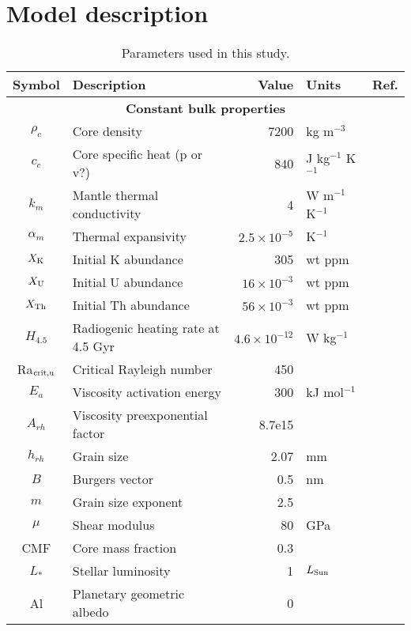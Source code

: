 \section{Model description}

\begin{table}
\centering
\caption{Parameters used in this study. \label{tab:params}}
\footnotesize
\begin{tabular}{@{} c l r l p{4cm} @{}}
\toprule
Symbol & Description & Value & Units & Ref. \\
\midrule
\multicolumn{5}{c}{\textbf{Constant bulk properties}} \\
$\rho_c$ & Core density & 7200 & kg m$^{-3}$ &  \citet{Thiriet2019}  \\
$c_c$ & Core specific heat (p or v?) & 840 & J kg$^{-1}$ K$^{-1}$  & \citet{Thiriet2019}  \\
$k_m$ & Mantle thermal conductivity & 4 & W m$^{-1}$ K$^{-1}$  & \citet{Thiriet2019}  \\
$\alpha_m$ & Thermal expansivity &  $2.5 \times 10^{-5}$ & K$^{-1}$  & \citet{Thiriet2019}  \\
$X_{\rm K}$ & Initial K abundance &  305 & wt ppm  & \citet{Jaupart2015} \\
$X_{\rm U}$ & Initial U abundance &  $16 \times 10^{-3}$ & wt ppm  & \citet{Jaupart2015} \\
$X_{\rm Th}$ & Initial Th abundance &  $56 \times 10^{-3}$ & wt ppm  & \citet{Jaupart2015} \\
$H_{4.5}$ & Radiogenic heating rate at 4.5 Gyr & $4.6\times 10^{-12}$ & W kg$^{-1}$ & \citet{Jaupart2015} \\
Ra$_{\rm crit, u}$ & Critical Rayleigh number & 450 &  & \citet{Thiriet2019}  \\
$E_a$ & Viscosity activation energy & 300 & kJ mol$^{-1}$ & \citet{Karato1993} \\
$A_{rh}$ & Viscosity preexponential factor & 8.7e15 & & \citet{Karato1993} \\
$h_{rh}$ & Grain size & 2.07 & mm & \\
$B$ & Burgers vector & 0.5 & nm & \citet{Karato1993} \\
$m$ & Grain size exponent & 2.5 & & \citet{Karato1993} \\
$\mu$ & Shear modulus & 80 & GPa & \citet{Karato1993} \\
CMF & Core mass fraction & 0.3 & & \\
$L_*$ & Stellar luminosity & 1 & $L_{\rm Sun}$ &  \\
Al & Planetary geometric albedo & 0 & &  \\


\end{tabular}
\end{table}
